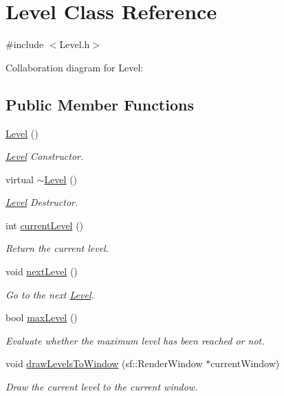 \hypertarget{class_level}{}\section{Level Class Reference}
\label{class_level}


{\ttfamily \#include $<$Level.\+h$>$}



Collaboration diagram for Level\+:
\subsection*{Public Member Functions}
\begin{DoxyCompactItemize}
\item 
\hyperlink{class_level_a7a696c928ca5d5354db6e50e46d0f67d}{Level} ()
\begin{DoxyCompactList}\small\item\em \hyperlink{class_level}{Level} Constructor. \end{DoxyCompactList}\item 
virtual \hyperlink{class_level_a249eac1e8f19ff44134efa5e986feaca}{$\sim$\+Level} ()
\begin{DoxyCompactList}\small\item\em \hyperlink{class_level}{Level} Destructor. \end{DoxyCompactList}\item 
int \hyperlink{class_level_a7ee14ca534888973fab088e511db1341}{current\+Level} ()
\begin{DoxyCompactList}\small\item\em Return the current level. \end{DoxyCompactList}\item 
void \hyperlink{class_level_a9e00624c99565b0bc3cedf7b7971818e}{next\+Level} ()
\begin{DoxyCompactList}\small\item\em Go to the next \hyperlink{class_level}{Level}. \end{DoxyCompactList}\item 
bool \hyperlink{class_level_a702a1a057a4572ea37b701126501621a}{max\+Level} ()
\begin{DoxyCompactList}\small\item\em Evaluate whether the maximum level has been reached or not. \end{DoxyCompactList}\item 
void \hyperlink{class_level_a4cdf43966bbd49ea4f392762c4cd7991}{draw\+Levels\+To\+Window} (sf\+::\+Render\+Window $\ast$current\+Window)
\begin{DoxyCompactList}\small\item\em Draw the current level to the current window. \end{DoxyCompactList}\end{DoxyCompactItemize}
